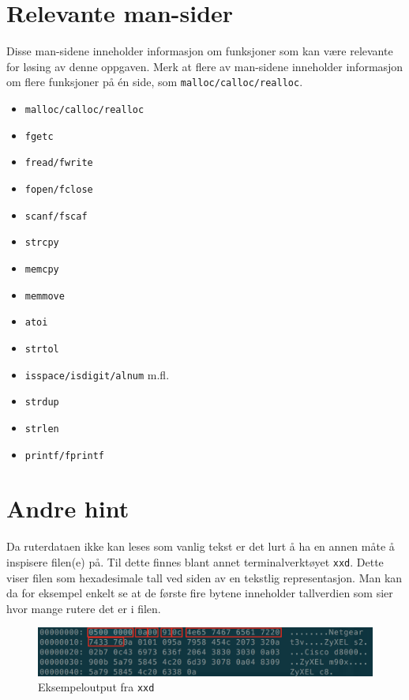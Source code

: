 \documentclass[norsk]{article}
\begin{document}
\newpage

\section*{Relevante man-sider}

Disse man-sidene inneholder informasjon om funksjoner som kan være relevante for løsing av denne oppgaven. Merk at
flere av man-sidene inneholder informasjon om flere funksjoner på én side, som \texttt{malloc/calloc/realloc}.

\begin{itemize}
    \item \texttt{malloc/calloc/realloc}
    \item \texttt{fgetc}
    \item \texttt{fread/fwrite}
    \item \texttt{fopen/fclose}
    \item \texttt{scanf/fscaf}
    \item \texttt{strcpy}
    \item \texttt{memcpy}
    \item \texttt{memmove}
    \item \texttt{atoi}
    \item \texttt{strtol}
    \item \texttt{isspace/isdigit/alnum} m.fl.
    \item \texttt{strdup}
    \item \texttt{strlen}
    \item \texttt{printf/fprintf}
\end{itemize}

\clearpage

\section*{Andre hint}

Da ruterdataen ikke kan leses som vanlig tekst er det lurt å ha en annen måte å inspisere filen(e) på. Til dette finnes blant annet terminalverktøyet \texttt{xxd}. Dette viser filen som hexadesimale tall ved siden av en tekstlig representasjon. Man kan da for eksempel enkelt se at de første fire bytene inneholder tallverdien som sier hvor mange rutere det er i filen.

\begin{figure}[H]
    \centering
    \includegraphics[width=\textwidth]{xxd_example.png}
    \caption{Eksempeloutput fra \texttt{xxd}}\label{fig:xxd}
    \vspace{1cm}
\end{figure}
\end{document}
